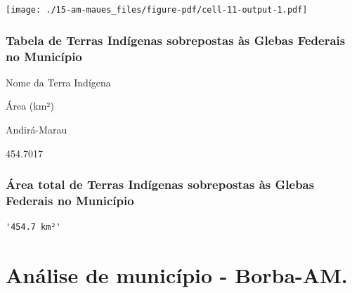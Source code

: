 \documentclass[
  letterpaper,
]{report}
\begin{document}
\texttt{[image: ./15-am-maues\_files/figure-pdf/cell-11-output-1.pdf]}

\hypertarget{tabela-de-terras-induxedgenas-sobrepostas-uxe0s-glebas-federais-no-municuxedpio}{%
\subsection{Tabela de Terras Indígenas sobrepostas às Glebas Federais no
Município}\label{tabela-de-terras-induxedgenas-sobrepostas-uxe0s-glebas-federais-no-municuxedpio}}

\n  

\n    

\n      

Nome da Terra Indígena

\n      

Área (km²)

\n    

\n  

\n  

\n    

\n      

Andirá-Marau

\n      

454.7017

\n    

\n  

\n

\hypertarget{uxe1rea-total-de-terras-induxedgenas-sobrepostas-uxe0s-glebas-federais-no-municuxedpio}{%
\subsection{Área total de Terras Indígenas sobrepostas às Glebas
Federais no
Município}\label{uxe1rea-total-de-terras-induxedgenas-sobrepostas-uxe0s-glebas-federais-no-municuxedpio}}

\begin{verbatim}
'454.7 km²'
\end{verbatim}


\hypertarget{anuxe1lise-de-municuxedpio---borba-am.}{%
\chapter{Análise de município -
Borba-AM.}\label{anuxe1lise-de-municuxedpio---borba-am.}}
\end{document}
